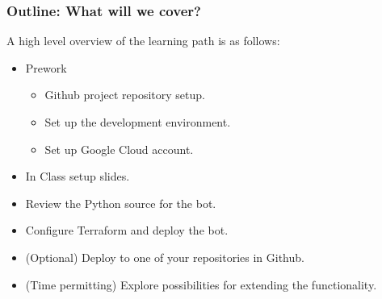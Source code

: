 \documentclass[aspectratio=169]{beamer}
\begin{document}
\begin{frame}
	\frametitle{Outline: What will we cover?}
	A high level overview of the learning path is as follows:
	\begin{raggedright}
		\begin{itemize}
			\item Prework
			\begin{itemize}
				\item Github project repository setup.
				\item Set up the development environment.
				\item Set up Google Cloud account.
			\end{itemize}
			\item In Class setup slides.
			\item Review the Python source for the bot.
			\item Configure Terraform and deploy the bot.
			\item (Optional) Deploy to one of your repositories in Github.
			\item (Time permitting) Explore possibilities for extending the functionality.
		\end{itemize}
	\end{raggedright}
	\vspace{2mm}
\end{frame}

\end{document}
